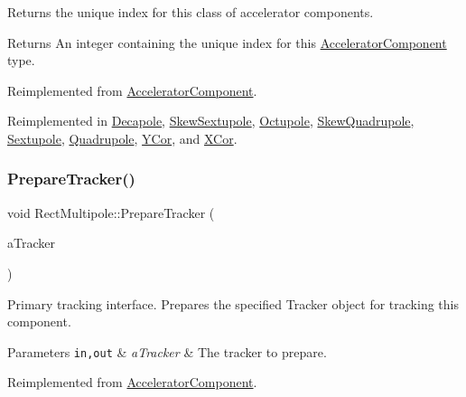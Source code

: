 Returns the unique index for this class of accelerator components. \begin{DoxyReturn}{Returns}
An integer containing the unique index for this \hyperlink{classAcceleratorComponent}{Accelerator\+Component} type. 
\end{DoxyReturn}


Reimplemented from \hyperlink{classAcceleratorComponent_abd1490171ac9af6004d3da01fb3b95fb}{Accelerator\+Component}.



Reimplemented in \hyperlink{classDecapole_ac34dc3e11924c94ff4464cc0ca5ddf68}{Decapole}, \hyperlink{classSkewSextupole_a8dbbf55904005b051ad5d84a9140ab10}{Skew\+Sextupole}, \hyperlink{classOctupole_acf28f59d4bb7f7ad6729e23902915d2b}{Octupole}, \hyperlink{classSkewQuadrupole_aa3fb2801ec77a1d9d4d7a4d603c2b767}{Skew\+Quadrupole}, \hyperlink{classSextupole_ab86d63dda91c41c870c89069724681a2}{Sextupole}, \hyperlink{classQuadrupole_a39b9e323df34c8db56f6daaaa112cf06}{Quadrupole}, \hyperlink{classYCor_a7e13236734c9ea7f52ecc2ee27523c4f}{Y\+Cor}, and \hyperlink{classXCor_abc1f1ab53804904384d6fadfcbaba5bb}{X\+Cor}.

\mbox{\label{classRectMultipole_a2626d08254eee03cffb73abb20a9381a}} 
\subsubsection{\texorpdfstring{Prepare\+Tracker()}{PrepareTracker()}}
{\footnotesize\ttfamily void Rect\+Multipole\+::\+Prepare\+Tracker (\begin{DoxyParamCaption}\item[{\hyperlink{classComponentTracker}{Component\+Tracker} \&}]{a\+Tracker }\end{DoxyParamCaption})\hspace{0.3cm}{\ttfamily [virtual]}}

Primary tracking interface. Prepares the specified Tracker object for tracking this component. 
\begin{DoxyParams}[1]{Parameters}
\mbox{\tt in,out}  & {\em a\+Tracker} & The tracker to prepare. \\
\hline
\end{DoxyParams}


Reimplemented from \hyperlink{classAcceleratorComponent_ab897c54689ac946f40c3ad0716ddd4bb}{Accelerator\+Component}.



